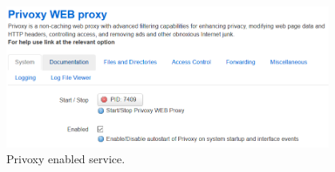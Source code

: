 \begin{appendices}
\begin{figure}[H]
    \centering
    \includegraphics[width=0.95\textwidth]{images/luciextra/enabled}
    \caption{Privoxy enabled service.}
    \label{fig:priven}
\end{figure}
\end{appendices}